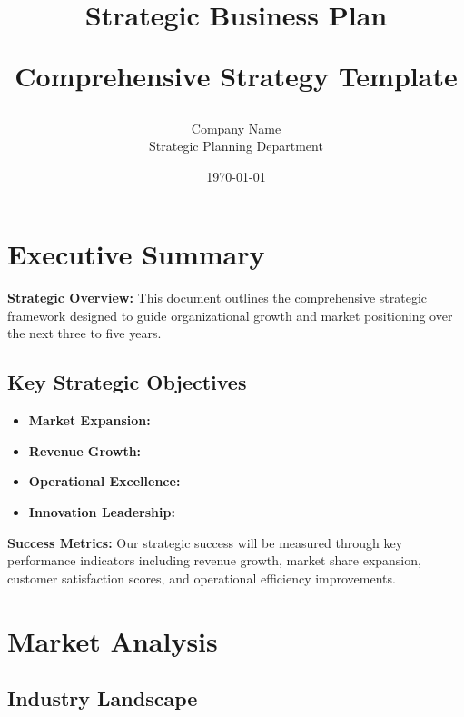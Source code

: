 \documentclass[11pt,a4paper]{article}
\title{
  \vspace{-2cm}
  \begin{tcolorbox}[
    colback=primary,
    coltext=white,
    boxrule=0pt,
    arc=8pt,
    width=\textwidth,
    center title
  ]
    \Huge\bfseries Strategic Business Plan
    \vspace{0.5cm}
    
    \Large Comprehensive Strategy Template
  \end{tcolorbox}
  \vspace{1cm}
}
\author{
  \textcolor{secondary}{\Large Company Name}\\
  \textcolor{secondary}{\normalsize Strategic Planning Department}
}
\date{\textcolor{secondary}{\today}}
\begin{document}
\maketitle
\thispagestyle{empty}

\newpage
\tableofcontents
\newpage

\section{Executive Summary}

\begin{keypoint}
\textbf{Strategic Overview:} This document outlines the comprehensive strategic framework designed to guide organizational growth and market positioning over the next three to five years.
\end{keypoint}

\lipsum[1-2]

\subsection{Key Strategic Objectives}

\begin{itemize}[leftmargin=*]
  \item \textbf{Market Expansion:} \lipsum[3][1-3]
  \item \textbf{Revenue Growth:} \lipsum[4][1-3]
  \item \textbf{Operational Excellence:} \lipsum[5][1-3]
  \item \textbf{Innovation Leadership:} \lipsum[6][1-3]
\end{itemize}

\begin{highlight}
\textbf{Success Metrics:} Our strategic success will be measured through key performance indicators including revenue growth, market share expansion, customer satisfaction scores, and operational efficiency improvements.
\end{highlight}

\section{Market Analysis}

\subsection{Industry Landscape}

\lipsum[7-8]
\end{document}

